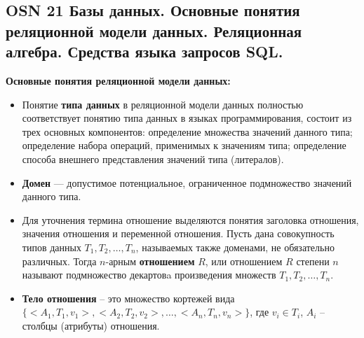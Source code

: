 \subsection{OSN 21 Базы данных. Основные понятия реляционной модели данных. Реляционная алгебра. Средства языка запросов SQL.}


\textbf{Основные понятия реляционной модели данных:}

\begin{itemize}
    \item Понятие \textbf{типа данных} в реляционной модели данных полностью соответствует понятию типа данных в языках программирования, состоит из трех основных компонентов: определение множества значений данного типа; определение набора операций, применимых к значениям типа; определение способа внешнего представления значений типа (литералов).
    \item \textbf{Домен} --- допустимое потенциальное, ограниченное подмножество значений данного типа.
    \item Для уточнения термина отношение выделяются понятия заголовка отношения, значения отношения и переменной отношения.
    Пусть дана совокупность типов данных $T_1, T_2, \dots, T_n$, называемых также доменами, не обязательно различных. Тогда $n$-арным \textbf{отношением} $R$, или отношением $R$ степени $n$ называют подмножество декартовa произведения множеств $T_1, T_2, \dots, T_n$.
    \item \textbf{Тело отношения} -- это множество кортежей вида $\{<A_1, T_1, v_1>, < A_2, T_2, v_2 >,\dots, < A_n, T_n, v_n>\}$, где $v_i \in T_i$, $A_i$ -- столбцы (атрибуты) отношения. 

\end{itemize}

